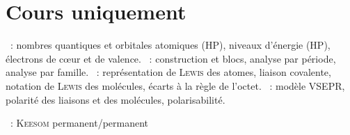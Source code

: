 \documentclass[a4paper, 12pt, final, garamond]{book}
\begin{document}
\section{Cours uniquement}
\begin{enumerate}[label=\Roman*]
	~: nombres quantiques et
	orbitales atomiques (HP), niveaux d'énergie (HP), électrons de cœur et de
	valence.
	~: construction et blocs, analyse par période,
	analyse par famille.
	~: représentation de
	\textsc{Lewis} des atomes, liaison covalente, notation de \textsc{Lewis}
	des molécules, écarts à la règle de l'octet.
	~: modèle VSEPR, polarité
	des liaisons et des molécules, polarisabilité.
\end{enumerate}

\begin{enumerate}[label=\Roman*]
	~: \textsc{Keesom}
	permanent/permanent
\end{enumerate}

\newpage
\end{document}
